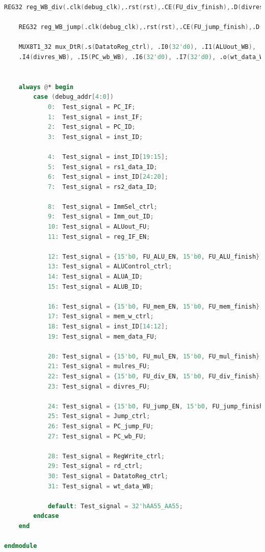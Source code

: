 \begin{lstlisting}[language = {verilog}]
	REG32 reg_WB_div(.clk(debug_clk),.rst(rst),.CE(FU_div_finish),.D(divres_FU),.Q(divres_WB));
	
	REG32 reg_WB_jump(.clk(debug_clk),.rst(rst),.CE(FU_jump_finish),.D(PC_wb_FU),.Q(PC_wb_WB));

	MUX8T1_32 mux_DtR(.s(DatatoReg_ctrl), .I0(32'd0), .I1(ALUout_WB), .I2(mem_data_WB), .I3(mulres_WB),
	.I4(divres_WB), .I5(PC_wb_WB), .I6(32'd0), .I7(32'd0), .o(wt_data_WB));  //to fill sth.in


	always @* begin
		case (debug_addr[4:0])
			0:  Test_signal = PC_IF;
			1:  Test_signal = inst_IF;
			2:  Test_signal = PC_ID;  
			3:  Test_signal = inst_ID;

			4:  Test_signal = inst_ID[19:15];
			5:  Test_signal = rs1_data_ID;
			6:  Test_signal = inst_ID[24:20];
			7:  Test_signal = rs2_data_ID;

			8:  Test_signal = ImmSel_ctrl;
			9:  Test_signal = Imm_out_ID;
			10: Test_signal = ALUout_FU;
			11: Test_signal = reg_IF_EN;

			12: Test_signal = {15'b0, FU_ALU_EN, 15'b0, FU_ALU_finish};
			13: Test_signal = ALUControl_ctrl;
			14: Test_signal = ALUA_ID;
			15: Test_signal = ALUB_ID;

			16: Test_signal = {15'b0, FU_mem_EN, 15'b0, FU_mem_finish};
			17: Test_signal = mem_w_ctrl;
			18: Test_signal = inst_ID[14:12];
			19: Test_signal = mem_data_FU;

			20: Test_signal = {15'b0, FU_mul_EN, 15'b0, FU_mul_finish};
			21: Test_signal = mulres_FU;
			22: Test_signal = {15'b0, FU_div_EN, 15'b0, FU_div_finish};
			23: Test_signal = divres_FU;

			24: Test_signal = {15'b0, FU_jump_EN, 15'b0, FU_jump_finish};
			25: Test_signal = Jump_ctrl;
			26: Test_signal = PC_jump_FU;
			27: Test_signal = PC_wb_FU;

			28: Test_signal = RegWrite_ctrl;
			29: Test_signal = rd_ctrl;
			30: Test_signal = DatatoReg_ctrl;
			31: Test_signal = wt_data_WB;
			
			default: Test_signal = 32'hAA55_AA55;
		endcase
	end

endmodule
\end{lstlisting}
